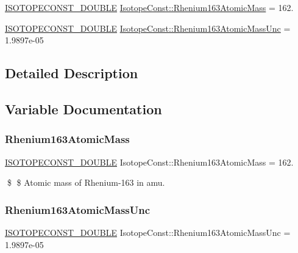 \begin{DoxyCompactItemize}
\item 
\mbox{\hyperlink{group___isotope_const-_macros_ga8f45a7272ce02c0b4c65c44636ed719a}{I\+S\+O\+T\+O\+P\+E\+C\+O\+N\+S\+T\+\_\+\+D\+O\+U\+B\+LE}} \mbox{\hyperlink{group___isotope_const-_rhenium-_re163_ga4bed084a06db5d4b8d1f29b8ad9c7430}{Isotope\+Const\+::\+Rhenium163\+Atomic\+Mass}} = 162.
\item 
\mbox{\hyperlink{group___isotope_const-_macros_ga8f45a7272ce02c0b4c65c44636ed719a}{I\+S\+O\+T\+O\+P\+E\+C\+O\+N\+S\+T\+\_\+\+D\+O\+U\+B\+LE}} \mbox{\hyperlink{group___isotope_const-_rhenium-_re163_ga5378e4878a59486e0354eaf741da65f0}{Isotope\+Const\+::\+Rhenium163\+Atomic\+Mass\+Unc}} = 1.\+9897e-\/05
\end{DoxyCompactItemize}


\subsection{Detailed Description}


\subsection{Variable Documentation}
\mbox{\label{group___isotope_const-_rhenium-_re163_ga4bed084a06db5d4b8d1f29b8ad9c7430}} 
\subsubsection{\texorpdfstring{Rhenium163\+Atomic\+Mass}{Rhenium163AtomicMass}}
{\footnotesize\ttfamily \mbox{\hyperlink{group___isotope_const-_macros_ga8f45a7272ce02c0b4c65c44636ed719a}{I\+S\+O\+T\+O\+P\+E\+C\+O\+N\+S\+T\+\_\+\+D\+O\+U\+B\+LE}} Isotope\+Const\+::\+Rhenium163\+Atomic\+Mass = 162.}

\$ \$ Atomic mass of Rhenium-\/163 in amu. \mbox{\label{group___isotope_const-_rhenium-_re163_ga5378e4878a59486e0354eaf741da65f0}} 
\subsubsection{\texorpdfstring{Rhenium163\+Atomic\+Mass\+Unc}{Rhenium163AtomicMassUnc}}
{\footnotesize\ttfamily \mbox{\hyperlink{group___isotope_const-_macros_ga8f45a7272ce02c0b4c65c44636ed719a}{I\+S\+O\+T\+O\+P\+E\+C\+O\+N\+S\+T\+\_\+\+D\+O\+U\+B\+LE}} Isotope\+Const\+::\+Rhenium163\+Atomic\+Mass\+Unc = 1.\+9897e-\/05}

